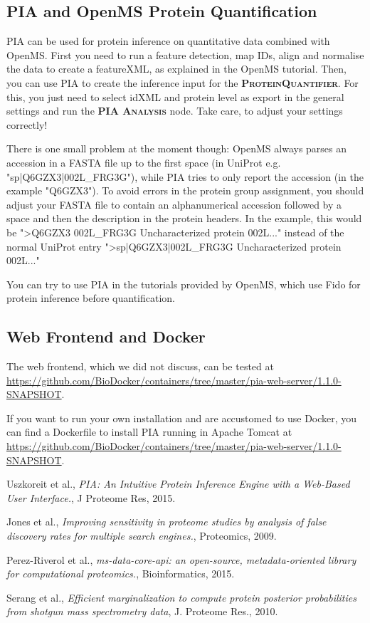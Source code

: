 \documentclass[a4paper,11pt,twoside]{article}
\newcommand{\knimenode}[1]{{\scshape\bfseries #1}}
\begin{document}
\subsection{PIA and OpenMS Protein Quantification}

PIA can be used for protein inference on quantitative data combined with
OpenMS. First you need to run a feature detection, map IDs, align and normalise
the data to create a featureXML, as explained in the OpenMS tutorial. Then, you
can use PIA to create the inference input for the
\knimenode{ProteinQuantifier}. For this, you just need to select idXML and
protein level as export in the general settings and run the \knimenode{PIA
Analysis} node. Take care, to adjust your settings correctly!

There is one small problem at the moment though: OpenMS always parses an
accession in a FASTA file up to the first space (in UniProt e.g.
"sp|Q6GZX3|002L\_FRG3G"), while PIA tries to only report the accession (in the
example "Q6GZX3"). To avoid errors in the protein group assignment, you should
adjust your FASTA file to contain an alphanumerical accession followed by a
space and then the description in the protein headers. In the example, this
would be ">Q6GZX3 002L\_FRG3G Uncharacterized protein 002L..." instead of the
normal UniProt entry ">sp|Q6GZX3|002L\_FRG3G Uncharacterized protein 002L..."

You can try to use PIA in the tutorials provided by OpenMS, which use Fido for
protein inference before quantification.


\subsection{Web Frontend and Docker}

The web frontend, which we did not discuss, can be tested at
\url{https://github.com/BioDocker/containers/tree/master/pia-web-server/1.1.0-SNAPSHOT}.

If you want to run your own installation and are accustomed to use Docker, you
can find a Dockerfile to install PIA running in Apache Tomcat at
\url{https://github.com/BioDocker/containers/tree/master/pia-web-server/1.1.0-SNAPSHOT}.



\newpage
\begin{thebibliography}{9}
	Uszkoreit et al.,
	\emph{PIA: An Intuitive Protein Inference Engine with a Web-Based User
	Interface.},
	J Proteome Res,
	2015.

	Jones et al.,
	\emph{Improving sensitivity in proteome studies by analysis of false
	discovery rates for multiple search engines.},
	Proteomics,
	2009.

	Perez-Riverol et al.,
	\emph{ms-data-core-api: an open-source, metadata-oriented library for
	computational proteomics.},
	Bioinformatics,
	2015.

	Serang et al.,
	\emph{Efficient marginalization to compute protein posterior probabilities
	from shotgun mass spectrometry data},
	J. Proteome Res.,
	2010.
\end{thebibliography}
\end{document}
